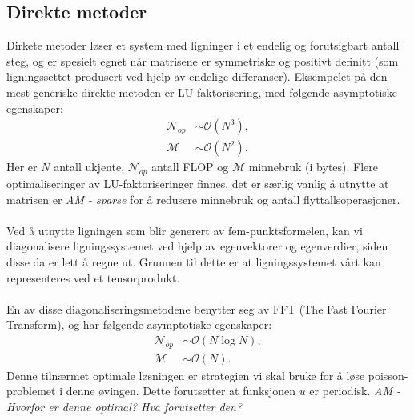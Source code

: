 \documentclass{article}
\begin{document}
\subsection{Direkte metoder}
Dirkete metoder løser et system med ligninger i et endelig og forutsigbart antall steg, og er spesielt egnet når matrisene er symmetriske og positivt definitt (som ligningssettet produsert ved hjelp av endelige differanser). Eksempelet på den mest generiske direkte metoden er LU-faktorisering, med følgende asymptotiske egenskaper:
\begin{align*}
      \mathcal{N}_{op} &\sim \mathcal{O}(N^3), \\
      \mathcal{M} &\sim \mathcal{O}(N^2).
\end{align*}
Her er $N$ antall ukjente,  $\mathcal{N}_{op}$ antall FLOP og $\mathcal{M}$ minnebruk (i bytes). Flere optimaliseringer av LU-faktoriseringer finnes, det er særlig vanlig å utnytte at matrisen er \emph{AM - sparse} for å redusere minnebruk og antall flyttallsoperasjoner. \\
\\
Ved å utnytte ligningen som blir generert av fem-punktsformelen, kan vi diagonalisere ligningssystemet ved hjelp av egenvektorer og egenverdier, siden disse da er lett å regne ut. Grunnen til dette er at ligningssystemet vårt kan representeres ved et tensorprodukt.\\
\\
En av disse diagonaliseringsmetodene benytter seg av FFT (The Fast Fourier Transform), og har følgende asymptotiske egenskaper:
\begin{align*}
  \mathcal{N}_{op} &\sim \mathcal{O}(N \log N), \\
  \mathcal{M} &\sim \mathcal{O}(N).
\end{align*}
Denne tilnærmet optimale løsningen er strategien vi skal bruke for å løse poisson-problemet i denne øvingen. Dette forutsetter at funksjonen $u$ er periodisk.
\emph{AM - Hvorfor er denne optimal? Hva forutsetter den?}
\end{document}
